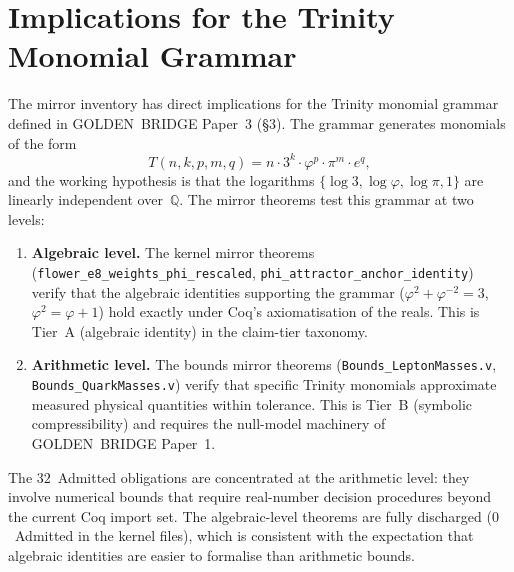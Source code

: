 \section{Implications for the Trinity Monomial Grammar}
\label{sec:ext:grammar}

The mirror inventory has direct implications for the Trinity monomial
grammar defined in GOLDEN~BRIDGE Paper~3 (\S3). The grammar generates
monomials of the form
\[
  T(n, k, p, m, q) = n \cdot 3^k \cdot \varphi^p \cdot \pi^m \cdot e^q,
\]
and the working hypothesis is that the logarithms
$\{\log 3, \log \varphi, \log \pi, 1\}$ are linearly independent
over~$\mathbb{Q}$. The mirror theorems test this grammar at two levels:

\begin{enumerate}
  \item \textbf{Algebraic level.} The kernel mirror theorems
        (\texttt{flower\_e8\_weights\_phi\_rescaled},
        \texttt{phi\_attractor\_anchor\_identity}) verify that the
        algebraic identities supporting the grammar ($\varphi^2 +
        \varphi^{-2} = 3$, $\varphi^2 = \varphi + 1$) hold exactly
        under Coq's axiomatisation of the reals. This is Tier~A
        (algebraic identity) in the claim-tier taxonomy.
  \item \textbf{Arithmetic level.} The bounds mirror theorems
        (\texttt{Bounds\_LeptonMasses.v},
        \texttt{Bounds\_QuarkMasses.v}) verify that specific
        Trinity monomials approximate measured physical quantities
        within tolerance. This is Tier~B (symbolic compressibility)
        and requires the null-model machinery of GOLDEN~BRIDGE Paper~1.
\end{enumerate}

The $32$~Admitted obligations are concentrated at the arithmetic level:
they involve numerical bounds that require real-number decision
procedures beyond the current Coq import set. The algebraic-level
theorems are fully discharged ($0$~Admitted in the kernel files), which
is consistent with the expectation that algebraic identities are easier
to formalise than arithmetic bounds.
